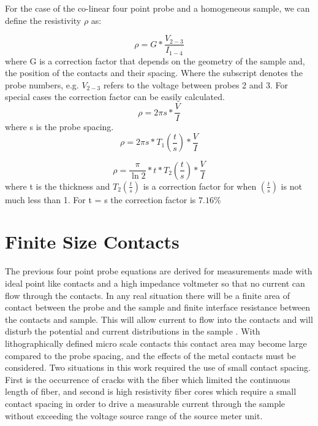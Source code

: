     
    For the case of the co-linear four point probe and a homogeneous sample, we can define the resistivity $\rho$ as:
    
    \begin{equation}
    \rho = G * \frac{V_{2-3}}{I_{1-4}}
    \end{equation}
    where G is a correction factor that depends on the geometry of the sample and, the position of the contacts and their spacing. Where the subscript denotes the probe numbers, e.g. $V_{2-3}$ refers to the voltage between probes 2 and 3. For special cases the correction factor can be easily calculated. 
    \begin{equation}
        \rho = 2 \pi s * \frac{V}{I} 
    \end{equation}
    where s is the probe spacing.
    \begin{equation}
        \rho = 2 \pi s *T_1 (\frac{t}{s})* \frac {V}{I} 
    \end{equation}
    
    
    \begin{equation}
        \rho = \frac{\pi}{\ln{2}} * t *T_2 (\frac{t}{s}) * \frac{V}{I}
    \end{equation}
    where t is the thickness and $T_2 (\frac{t}{s})$ is a correction factor for when $(\frac{t}{s})$ is not much less than 1. For t = s the correction factor is $7.16 \%$
    
    
\section{Finite Size Contacts}
 The previous four point probe equations are derived for measurements made with ideal point like contacts and a high impedance voltmeter so that no current can flow through the contacts. In any real situation there will be a finite area of contact between the probe and the sample and finite interface resistance between the contacts and sample. This will allow current to flow into the contacts and will disturb the potential and current distributions in the sample \cite{Zimney2007CorrectionStudy}. With lithographically defined micro scale contacts this contact area may become large compared to the probe spacing, and the effects of the metal contacts must be considered. %
 Two situations in this work required the use of small contact spacing. First is the occurrence of cracks with the fiber which limited the continuous length of fiber, and second is high resistivity fiber cores which require a small contact spacing in order to drive a measurable current through the sample without exceeding the voltage source range of the source meter unit. 
 
